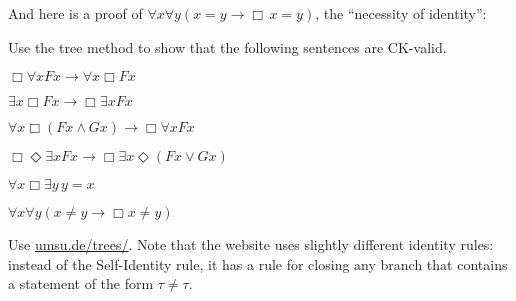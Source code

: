 And here is a proof of $\forall x \forall y(x\!=\!y \to \Box\, x\!=\!y)$, the
``necessity of identity'':
%
\medskip
\begin{center}
\end{center}

\begin{exercise}\label{ex:CKexamples}
  Use the tree method to show that the following sentences are
  CK-valid. 
  \begin{exlist}
  \item $ \Box \forall x Fx \to \forall x \Box Fx$
  \item $ \exists x \Box Fx \to \Box \exists x Fx$
  \item $ \forall x \Box (Fx \land Gx) \to \Box \forall x Fx$
  \item $ \Box\Diamond \exists x Fx \to \Box \exists x \Diamond(Fx \lor Gx)$ %
  \item $\forall x \Box \exists y\, y\!=\!x$
  \item $ \forall x \forall y(x\!\not=\!y \to \Box x\!\not=\!y)$
  \end{exlist}
\end{exercise}
\begin{solution}
  Use \href{https://www.umsu.de/trees/}{umsu.de/trees/}.
  Note that the website uses slightly different identity rules: instead of the
  Self-Identity rule, it has a rule for closing any branch that contains a
  statement of the form $\tau \not= \tau$.
\end{solution}

